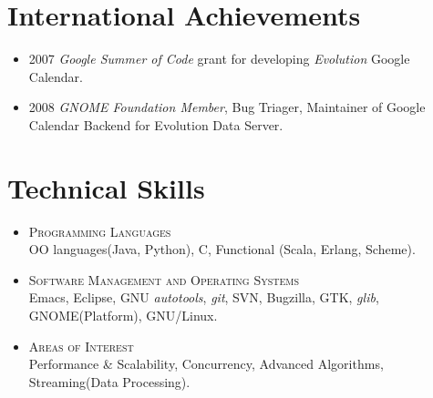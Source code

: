 \documentclass[a4paper,10pt]{article}
\begin{document}
\section{International Achievements}
  \begin{itemize}
  \item \textsc{2007} \emph{Google Summer of Code} grant for developing \emph{Evolution} Google Calendar.
  \item \textsc{2008} \emph{GNOME Foundation Member}, Bug Triager, Maintainer of Google Calendar Backend for Evolution Data Server.
  \end{itemize}
    
\section{Technical Skills}
  \begin{itemize}
  \item \textsc{Programming Languages} \\
    OO languages(Java, Python), C, Functional (Scala, Erlang, Scheme).    
  \item \textsc{Software Management and Operating Systems} \\
    Emacs, Eclipse, GNU \emph{autotools}, \emph{git}, SVN, Bugzilla, GTK, \emph{glib}, GNOME(Platform), GNU/Linux.
  \item \textsc{Areas of Interest} \\
    Performance \& Scalability, Concurrency, Advanced Algorithms, Streaming(Data Processing).
  \end{itemize}
  
\end{document}

